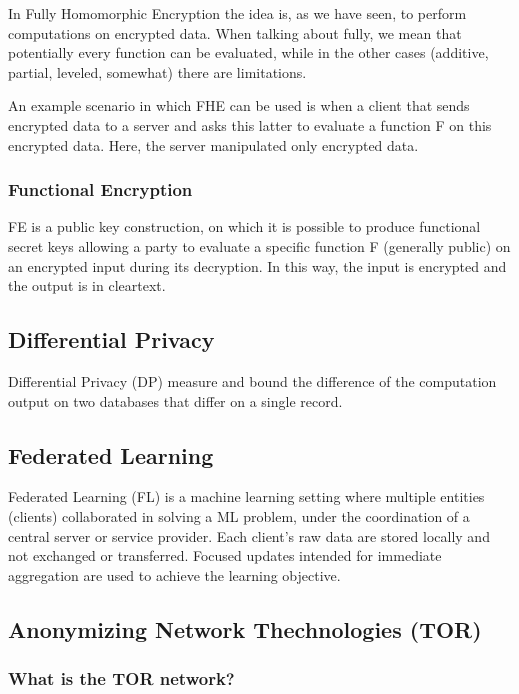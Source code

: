 In Fully Homomorphic Encryption the idea is, as we have seen, to perform computations on encrypted data. When talking about fully, we mean that potentially every function can be evaluated, while in the other cases (additive, partial, leveled, somewhat) there are limitations.\newline

An example scenario in which FHE can be used is when a client that sends encrypted data to a server and asks this latter to evaluate a function F on this encrypted data. Here, the server manipulated only encrypted data. 

\subsubsection{Functional Encryption}

FE is a public key construction, on which it is possible to produce functional secret keys allowing a party to evaluate a specific function F (generally public) on an encrypted input during its decryption. In this way, the input is encrypted and the output is in cleartext.

\subsection{Differential Privacy}
Differential Privacy (DP) measure and bound the difference of the computation output on two databases that differ on a single record. 

\subsection{Federated Learning}

Federated Learning (FL) is a machine learning setting where multiple entities (clients) collaborated in solving a ML problem, under the coordination of a central server or service provider. Each client's raw data are stored locally and not exchanged or transferred. 
Focused updates intended for immediate aggregation are used to achieve the learning objective. 

\subsection{Anonymizing Network Thechnologies (TOR)}

\subsubsection{What is the TOR network?}

